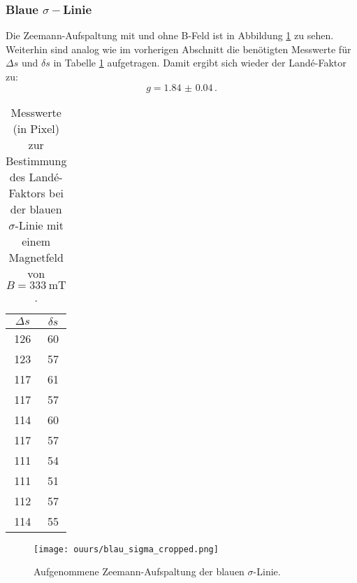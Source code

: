 \subsubsection{Blaue \texorpdfstring{$\sigma-$}ALinie}
	Die Zeemann-Aufspaltung mit und ohne B-Feld ist in Abbildung \ref{fig:blau_sigma}
	zu sehen. Weiterhin sind analog wie im vorherigen Abschnitt die benötigten Messwerte
	für $\Delta s$ und $\delta s$ in Tabelle \ref{tab:blau_sigma} aufgetragen.
	Damit ergibt sich wieder der Landé-Faktor zu:
	\begin{equation*}
		g = \SI{1.84(4)} \, \text{.}
	\end{equation*}
	\begin{table}
		\centering
		\caption{Messwerte (in Pixel) zur Bestimmung des Landé-Faktors bei der blauen $\sigma$-Linie mit einem Magnetfeld von $B = \SI{333}{\milli\tesla}$.}
		\label{tab:blau_sigma}
		\begin{tabular}{c | c}
			\toprule
			$\Delta s$ & $\delta s$\\
			\midrule
			126 & 60 \\
			123 & 57 \\
			117 & 61 \\
			117 & 57 \\
			114 & 60 \\
			117 & 57 \\
			111 & 54 \\
			111 & 51 \\
			112 & 57 \\
			114 & 55 \\
			\bottomrule
		\end{tabular}
	\end{table}
	\begin{figure}
	\centering
	\texttt{[image: ouurs/blau\_sigma\_cropped.png]}
	\caption{Aufgenommene Zeemann-Aufspaltung der blauen $\sigma$-Linie.}
	\label{fig:blau_sigma}
\end{figure}

\FloatBarrier
